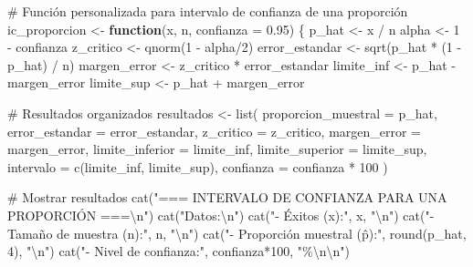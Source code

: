 \documentclass[
  spanish,
  letterpaper,
]{book}
\newenvironment{Shaded}{\begin{snugshade}}{\end{snugshade}}
\newcommand{\AttributeTok}[1]{\textcolor[rgb]{0.40,0.45,0.13}{#1}}
\newcommand{\CommentTok}[1]{\textcolor[rgb]{0.37,0.37,0.37}{#1}}
\newcommand{\ControlFlowTok}[1]{\textcolor[rgb]{0.00,0.23,0.31}{\textbf{#1}}}
\newcommand{\DecValTok}[1]{\textcolor[rgb]{0.68,0.00,0.00}{#1}}
\newcommand{\FloatTok}[1]{\textcolor[rgb]{0.68,0.00,0.00}{#1}}
\newcommand{\FunctionTok}[1]{\textcolor[rgb]{0.28,0.35,0.67}{#1}}
\newcommand{\NormalTok}[1]{\textcolor[rgb]{0.00,0.23,0.31}{#1}}
\newcommand{\OtherTok}[1]{\textcolor[rgb]{0.00,0.23,0.31}{#1}}
\newcommand{\SpecialCharTok}[1]{\textcolor[rgb]{0.37,0.37,0.37}{#1}}
\newcommand{\StringTok}[1]{\textcolor[rgb]{0.13,0.47,0.30}{#1}}
\begin{document}
\begin{Shaded}
\begin{Highlighting}[]
\CommentTok{\# Función personalizada para intervalo de confianza de una proporción}
\NormalTok{ic\_proporcion }\OtherTok{\textless{}{-}} \ControlFlowTok{function}\NormalTok{(x, n, }\AttributeTok{confianza =} \FloatTok{0.95}\NormalTok{) \{}
\NormalTok{  p\_hat }\OtherTok{\textless{}{-}}\NormalTok{ x }\SpecialCharTok{/}\NormalTok{ n}
\NormalTok{  alpha }\OtherTok{\textless{}{-}} \DecValTok{1} \SpecialCharTok{{-}}\NormalTok{ confianza}
\NormalTok{  z\_critico }\OtherTok{\textless{}{-}} \FunctionTok{qnorm}\NormalTok{(}\DecValTok{1} \SpecialCharTok{{-}}\NormalTok{ alpha}\SpecialCharTok{/}\DecValTok{2}\NormalTok{)}
\NormalTok{  error\_estandar }\OtherTok{\textless{}{-}} \FunctionTok{sqrt}\NormalTok{(p\_hat }\SpecialCharTok{*}\NormalTok{ (}\DecValTok{1} \SpecialCharTok{{-}}\NormalTok{ p\_hat) }\SpecialCharTok{/}\NormalTok{ n)}
\NormalTok{  margen\_error }\OtherTok{\textless{}{-}}\NormalTok{ z\_critico }\SpecialCharTok{*}\NormalTok{ error\_estandar}
\NormalTok{  limite\_inf }\OtherTok{\textless{}{-}}\NormalTok{ p\_hat }\SpecialCharTok{{-}}\NormalTok{ margen\_error}
\NormalTok{  limite\_sup }\OtherTok{\textless{}{-}}\NormalTok{ p\_hat }\SpecialCharTok{+}\NormalTok{ margen\_error}
  
  \CommentTok{\# Resultados organizados}
\NormalTok{  resultados }\OtherTok{\textless{}{-}} \FunctionTok{list}\NormalTok{(}
    \AttributeTok{proporcion\_muestral =}\NormalTok{ p\_hat,}
    \AttributeTok{error\_estandar =}\NormalTok{ error\_estandar,}
    \AttributeTok{z\_critico =}\NormalTok{ z\_critico,}
    \AttributeTok{margen\_error =}\NormalTok{ margen\_error,}
    \AttributeTok{limite\_inferior =}\NormalTok{ limite\_inf,}
    \AttributeTok{limite\_superior =}\NormalTok{ limite\_sup,}
    \AttributeTok{intervalo =} \FunctionTok{c}\NormalTok{(limite\_inf, limite\_sup),}
    \AttributeTok{confianza =}\NormalTok{ confianza }\SpecialCharTok{*} \DecValTok{100}
\NormalTok{  )}
  
  \CommentTok{\# Mostrar resultados}
  \FunctionTok{cat}\NormalTok{(}\StringTok{"=== INTERVALO DE CONFIANZA PARA UNA PROPORCIÓN ===}\SpecialCharTok{\textbackslash{}n}\StringTok{"}\NormalTok{)}
  \FunctionTok{cat}\NormalTok{(}\StringTok{"Datos:}\SpecialCharTok{\textbackslash{}n}\StringTok{"}\NormalTok{)}
  \FunctionTok{cat}\NormalTok{(}\StringTok{"{-} Éxitos (x):"}\NormalTok{, x, }\StringTok{"}\SpecialCharTok{\textbackslash{}n}\StringTok{"}\NormalTok{)}
  \FunctionTok{cat}\NormalTok{(}\StringTok{"{-} Tamaño de muestra (n):"}\NormalTok{, n, }\StringTok{"}\SpecialCharTok{\textbackslash{}n}\StringTok{"}\NormalTok{)}
  \FunctionTok{cat}\NormalTok{(}\StringTok{"{-} Proporción muestral (p̂):"}\NormalTok{, }\FunctionTok{round}\NormalTok{(p\_hat, }\DecValTok{4}\NormalTok{), }\StringTok{"}\SpecialCharTok{\textbackslash{}n}\StringTok{"}\NormalTok{)}
  \FunctionTok{cat}\NormalTok{(}\StringTok{"{-} Nivel de confianza:"}\NormalTok{, confianza}\SpecialCharTok{*}\DecValTok{100}\NormalTok{, }\StringTok{"\%}\SpecialCharTok{\textbackslash{}n\textbackslash{}n}\StringTok{"}\NormalTok{)}
  

\end{Highlighting}
\end{Shaded}
\end{document}
